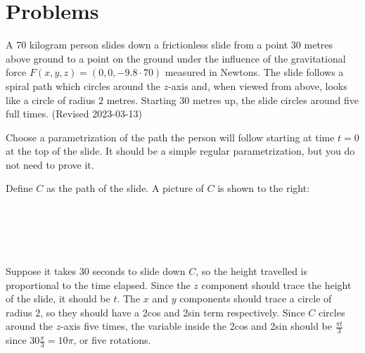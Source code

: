 \documentclass{exam}
\begin{document}
\maketitle

\vspace*{-15pt}
\makeinstructions
 
\section*{Problems} 

\CorrectChoiceCircle %

\begin{questions}


\question  A 70 kilogram person slides down a frictionless slide from a point $30$ metres above ground to a point on the ground under the influence of the gravitational force $F(x,y,z) = (0, 0, -9.8 \cdot 70)$ measured in Newtons. The slide follows a spiral path which circles around the $z$-axis and, when viewed from above,  looks like a circle of radius $2$ metres. Starting $30$ metres up, the slide circles around five full times. ({\color{Yellow}Revised 2023-03-13})
\begin{parts}


\item Choose a parametrization of the path the person will follow starting at time $t=0$ at the top of the slide. It should be a simple regular parametrization, but you do not need to prove it. 

\begin{answer}{200pt}
Define $C$ as the path of the slide. A picture of $C$ is shown to the right:\\\\\\\\\\\\

Suppose it takes 30 seconds to slide down $C$, so the height travelled is proportional to the time elapsed. Since the $z$ component should trace the height of the slide, it should be $t$. The $x$ and $y$ components should trace a circle of radius 2, so they should have a 2cos and 2sin term respectively. Since $C$ circles around the $z$-axis five times, the variable inside the 2cos and 2sin should be $\frac{\pi t}{3}$ since $30\frac{\pi}{3} = 10\pi$, or five rotations.\\


\end{answer}
\end{parts}
\end{questions}
\end{document}
